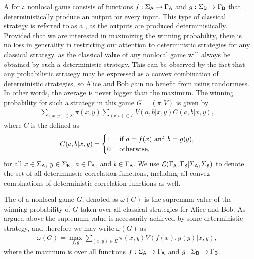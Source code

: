 A  for a nonlocal game consists of functions $f : \Sigma_{\mathsf{A}} \rightarrow \Gamma_{\mathsf{A}}$ and $g : \Sigma_{\mathsf{B}} \rightarrow \Gamma_{\mathsf{B}}$ that deterministically produce an output for every input. This type of classical strategy is referred to as a , as the outputs are produced deterministically. Provided that we are interested in maximizing the winning probability, there is no loss in generality in restricting our attention to deterministic strategies for any classical strategy, as the classical value of any nonlocal game will always be obtained by such a deterministic strategy. This can be observed by the fact that any probabilistic strategy may be expressed as a convex combination of deterministic strategies, so Alice and Bob gain no benefit from using randomness. In other words, the average is never bigger than the maximum. The winning probability for such a strategy in this game $G = (\pi,V)$ is given by
\begin{align}
	\sum_{(x,y) \in \Sigma} \pi(x,y) \sum_{(a,b) \in \Gamma} V(a,b|x,y) C(a,b|x,y),
\end{align}
where $C$ is the  defined as 
\[
 C(a,b|x,y) =
  \begin{cases} 
      \hfill 1 \hfill & \text{ if $a = f(x) \textnormal{ and } b = g(y)$,} \\
      \hfill 0 \hfill & \text{ otherwise,} \\
  \end{cases}
\]
for all $x \in \Sigma_{\mathsf{A}}$, $y \in \Sigma_{\mathsf{B}}$, $a \in \Gamma_{\mathsf{A}}$, and $b \in \Gamma_{\mathsf{B}}$. We use $\mathcal{L}(\Gamma_{\mathsf{A}},\Gamma_{\mathsf{B}}|\Sigma_{\mathsf{A}},\Sigma_{\mathsf{B}})$ to denote the set of all deterministic correlation functions, including all convex combinations of deterministic correlation functions as well.

The  of a nonlocal game $G$, denoted as $\omega(G)$ is the supremum value of the winning probability of $G$ taken over all classical strategies for Alice and Bob. As argued above the supremum value is necessarily achieved by some deterministic strategy, and therefore we may write $\omega(G)$ as 
\begin{align}
	\omega(G) = \max_{f,g} \sum_{(x,y) \in \Sigma} \pi(x,y) V(f(x),g(y)|x,y),
\end{align}
where the maximum is over all functions $f: \Sigma_{\mathsf{A}} \rightarrow \Gamma_{\mathsf{A}}$ and $g: \Sigma_{\mathsf{B}} \rightarrow \Gamma_{\mathsf{B}}$. 

